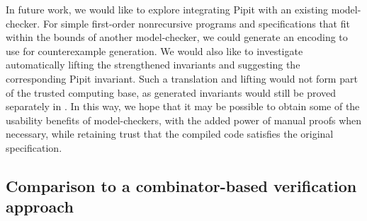 In future work, we would like to explore integrating Pipit with an existing model-checker.
For simple first-order nonrecursive programs and specifications that fit within the bounds of another model-checker, we could generate an encoding to use for counterexample generation.
We would also like to investigate automatically lifting the strengthened invariants and suggesting the corresponding Pipit invariant.
Such a translation and lifting would not form part of the trusted computing base, as generated invariants would still be proved separately in \fstar{}.
In this way, we hope that it may be possible to obtain some of the usability benefits of model-checkers, with the added power of manual proofs when necessary, while retaining trust that the compiled code satisfies the original specification.

\subsection{Comparison to a combinator-based verification approach}






